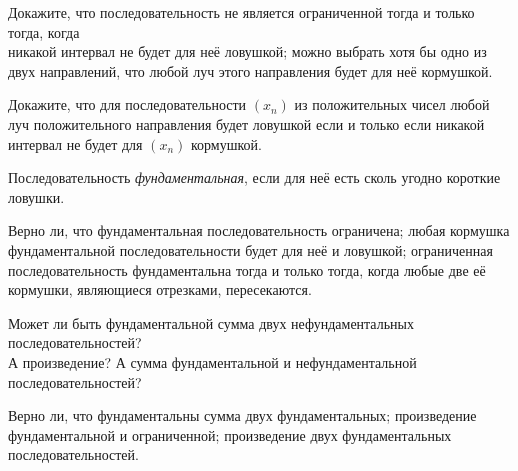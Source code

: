 \documentclass[a4paper,11pt]{article}
\begin{document}
Докажите, что последовательность не является ограниченной тогда и только тогда, когда \\
 никакой интервал не будет для неё ловушкой;
 можно выбрать хотя бы одно из двух направлений, что любой луч этого направления будет для неё кормушкой.

Докажите, что для последовательности $(x_n)$ из положительных чисел любой луч положительного направления будет ловушкой если и только если никакой интервал не будет для $(x_n)$ кормушкой.


Последовательность {\em фундаментальная}, если для неё есть сколь угодно короткие ловушки.

Верно ли, что
 фундаментальная последовательность ограничена;
 любая кормушка фундаментальной последовательности будет для неё и ловушкой;
 ограниченная последовательность фундаментальна тогда и только тогда, когда любые две её кормушки, являющиеся отрезками, пересекаются.

 Может ли быть фундаментальной сумма двух нефундаментальных последовательностей?\\
 А произведение?
 А сумма фундаментальной и нефундаментальной последовательностей?

 Верно ли, что фундаментальны
 сумма двух фундаментальных;
 произведение фундаментальной и ограниченной;
 произведение двух фундаментальных последовательностей.



\end{document}
